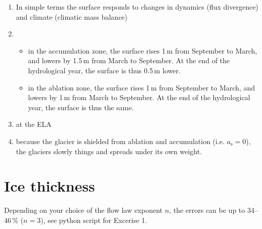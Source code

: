\documentclass[DIV15,11pt,parskip=half]{scrartcl}
\begin{document}
\begin{enumerate}
\item In simple terms the surface responds to changes in dynamics (flux divergence) and climate (climatic mass balance)
\item
\begin{itemize}
\item in the accumulation zone, the surface rises 1\,m from September to March, and lowers by 1.5\,m from March to September. At the end of the hydrological year, the surface is thus 0.5\,m lower.
\item in the ablation zone, the surface rises 1\,m from September to March, and lowers by 1\,m from March to September. At the end of the hydrological year, the surface is thus the same.
\end{itemize}
\item at the ELA
\item because the glacier is shielded from ablation and accumulation (i.e. $a_{\textrm{s}} =0$), the glaciers slowly things and spreads under its own weight.
\end{enumerate}

\section{Ice thickness}

Depending on your choice of the flow law exponent $n$, the errors can be up to 34--46\,\% ($n=3$), see python script for Excerise 1.
\end{document}
